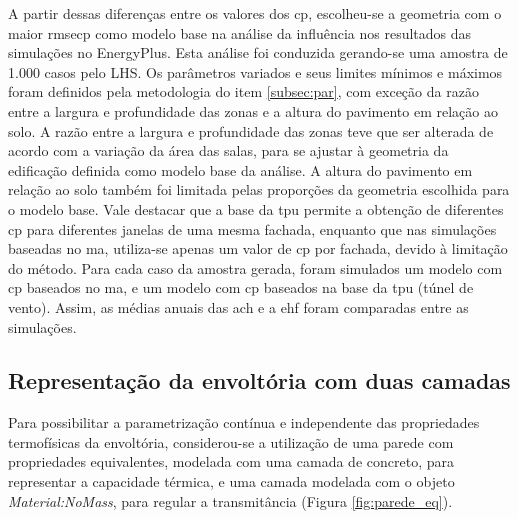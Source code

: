 \documentclass[brazil,hardcopy,openany]{ufscthesis} %
\newcommand{\figsize}{.6}
\begin{document}
A partir dessas diferenças entre os valores dos \acrshort{cp}, escolheu-se a geometria com o maior  \gls{rmsecp} como modelo base na análise da influência nos resultados das simulações no EnergyPlus.
Esta análise foi conduzida gerando-se uma amostra de 1.000 casos pelo LHS.
Os parâmetros variados e seus limites mínimos e máximos foram definidos pela metodologia do item \ref{subsec:par}, com exceção da razão entre a largura e profundidade das zonas e a altura do pavimento em relação ao solo.
A razão entre a largura e profundidade das zonas teve que ser alterada de acordo com a variação da área das salas, para se ajustar à geometria da edificação definida como modelo base da análise.
A altura do pavimento em relação ao solo também foi limitada pelas proporções da geometria escolhida para o modelo base.
Vale destacar que a base da \acrshort{tpu} permite a obtenção de diferentes \acrshort{cp} para diferentes janelas de uma mesma fachada, enquanto que nas simulações baseadas no \acrlong{ma}, utiliza-se apenas um valor de \acrshort{cp} por fachada, devido à limitação do método. 
Para cada caso da amostra gerada, foram simulados um modelo com \acrshort{cp} baseados no \acrlong{ma}, e um modelo com \acrshort{cp} baseados na base da \acrshort{tpu} (túnel de vento).
Assim, as médias anuais das \acrfull{ach} e a \acrshort{ehf} foram comparadas entre as simulações.

%		

\subsection*{Representação da envoltória com duas camadas}

Para possibilitar a parametrização contínua e independente das propriedades termofísicas da envoltória, considerou-se a utilização de uma parede com propriedades equivalentes, modelada com uma camada de concreto, para representar a capacidade térmica, e uma camada modelada com o objeto \textit{Material:NoMass}, para regular a transmitância (Figura \ref{fig:parede_eq}).
\end{document}
